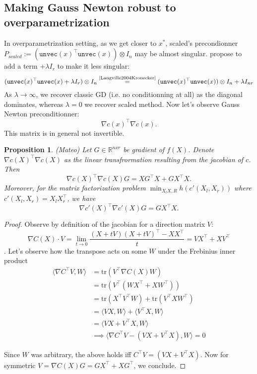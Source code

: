 \documentclass{article}
\newtheorem{proposition}{Proposition}
\begin{document}
\subsection{Making Gauss Newton robust to overparametrization}
In overparametrization setting, as we get closer to $x^*$, scaled's precondionner $P_{scaled}:=(\texttt{unvec}(x)^\top \texttt{unvec}(x))\otimes I_{n}$ may be almost singular.  \cite{xu2023power} propose to add a term $+\lambda I_{r}$ to make it less singular: $$
(\texttt{unvec}(x)^\top \texttt{unvec}(x) + \lambda I_r)\otimes I_{n} \overset{\text{\cite{Langville2004Kronecker}}}{=} (\texttt{unvec}(x)^\top \texttt{unvec}(x) ) \otimes I_n + \lambda I_{nr}
$$
As $\lambda \to \infty$,  we recover classic GD (i.e. no conditionning at all) as the diagonal dominates, whereas $\lambda = 0$ we recover scaled method. Now let's observe Gauss Newton preconditionner:
$$
\nabla c(x)^\top \nabla c(x).
$$
This matrix is in general not invertible.


\begin{proposition} (Mateo)
    Let $G \in \mathbb{R}^{nxr}$ be gradient of $f(X)$. Denote $\nabla c(X)^\top \nabla c(X)$ as the linear transfrormation resulting from the jacobian of $c$. Then
    $$
     \nabla c(X)^\top \nabla c(X) G = XG^\top X + GX^\top X. 
    $$ Moreover, for the matrix factorization problem $\min_{X_l X,R} h(c'(X_l,X_r)) $ where $c'(X_l,X_r) = X_l X_r^\top$, we have  
    $$
    \nabla c'(X)^\top \nabla c'(X) G = GX^\top X. 
    $$
    
\end{proposition}
\begin{proof}
    Observe by definition of the jacobian for a direction matrix $V$: $$\nabla C(X) \cdot  V =  \lim_{t\to 0}  \frac{(X+tV)(X+tV)^\top - XX^\top   }{t} = VX^\top + XV^\top$$.
    Let's observe how the transpose acts on some $W$ under the Frebinius inner product
\begin{align*}
    \langle \nabla C^\top V, W \rangle & = \text{tr}(V^\top \nabla C(X) W) \\
    & = \text{tr}( V^\top (WX^\top + XW^\top)) \\
    & = \text{tr}(X^\top V^\top W) + \text{tr}(V^\top X W^\top) \\
    & = \langle V X, W \rangle + \langle V^\top X, W \rangle \\
    & = \langle VX + V^\top X, W \rangle \\
    & \implies \langle \nabla C^\top V -  (VX + V^\top X), W \rangle = 0
\end{align*}

    Since $W$ was arbitrary, the above holds iff $ C^\top V = (V X + V^\top X)$. Now for symmetric $V= \nabla C(X) G = GX^\top + X G^\top$, we conclude.
\end{proof}
\end{document}
